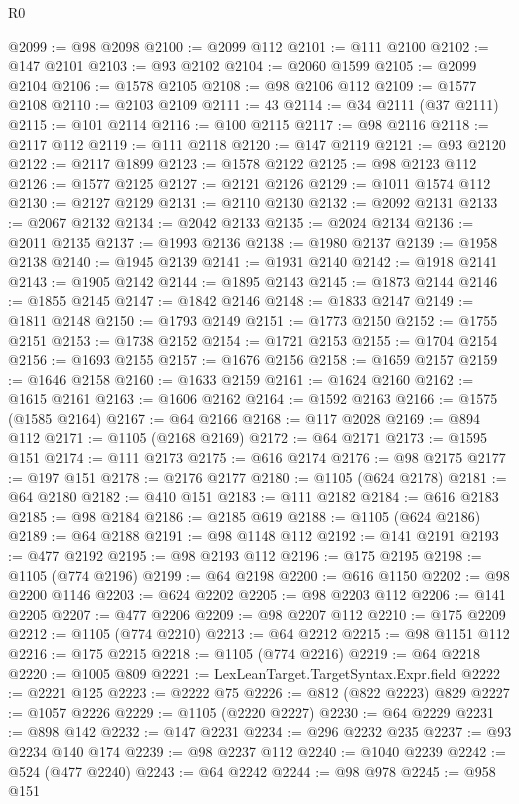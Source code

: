 \begin{lexlean}{R0}
\begin{coremodule}
@2099 := @98 @2098
@2100 := @2099 @112
@2101 := @111 @2100
@2102 := @147 @2101
@2103 := @93 @2102
@2104 := @2060 @1599
@2105 := @2099 @2104
@2106 := @1578 @2105
@2108 := @98 @2106 @112
@2109 := @1577 @2108
@2110 := @2103 @2109
@2111 := 43
@2114 := @34 @2111 (@37 @2111)
@2115 := @101 @2114
@2116 := @100 @2115
@2117 := @98 @2116
@2118 := @2117 @112
@2119 := @111 @2118
@2120 := @147 @2119
@2121 := @93 @2120
@2122 := @2117 @1899
@2123 := @1578 @2122
@2125 := @98 @2123 @112
@2126 := @1577 @2125
@2127 := @2121 @2126
@2129 := @1011 @1574 @112
@2130 := @2127 @2129
@2131 := @2110 @2130
@2132 := @2092 @2131
@2133 := @2067 @2132
@2134 := @2042 @2133
@2135 := @2024 @2134
@2136 := @2011 @2135
@2137 := @1993 @2136
@2138 := @1980 @2137
@2139 := @1958 @2138
@2140 := @1945 @2139
@2141 := @1931 @2140
@2142 := @1918 @2141
@2143 := @1905 @2142
@2144 := @1895 @2143
@2145 := @1873 @2144
@2146 := @1855 @2145
@2147 := @1842 @2146
@2148 := @1833 @2147
@2149 := @1811 @2148
@2150 := @1793 @2149
@2151 := @1773 @2150
@2152 := @1755 @2151
@2153 := @1738 @2152
@2154 := @1721 @2153
@2155 := @1704 @2154
@2156 := @1693 @2155
@2157 := @1676 @2156
@2158 := @1659 @2157
@2159 := @1646 @2158
@2160 := @1633 @2159
@2161 := @1624 @2160
@2162 := @1615 @2161
@2163 := @1606 @2162
@2164 := @1592 @2163
@2166 := @1575 (@1585 @2164)
@2167 := @64 @2166
@2168 := @117 @2028
@2169 := @894 @112
@2171 := @1105 (@2168 @2169)
@2172 := @64 @2171
@2173 := @1595 @151
@2174 := @111 @2173
@2175 := @616 @2174
@2176 := @98 @2175
@2177 := @197 @151
@2178 := @2176 @2177
@2180 := @1105 (@624 @2178)
@2181 := @64 @2180
@2182 := @410 @151
@2183 := @111 @2182
@2184 := @616 @2183
@2185 := @98 @2184
@2186 := @2185 @619
@2188 := @1105 (@624 @2186)
@2189 := @64 @2188
@2191 := @98 @1148 @112
@2192 := @141 @2191
@2193 := @477 @2192
@2195 := @98 @2193 @112
@2196 := @175 @2195
@2198 := @1105 (@774 @2196)
@2199 := @64 @2198
@2200 := @616 @1150
@2202 := @98 @2200 @1146
@2203 := @624 @2202
@2205 := @98 @2203 @112
@2206 := @141 @2205
@2207 := @477 @2206
@2209 := @98 @2207 @112
@2210 := @175 @2209
@2212 := @1105 (@774 @2210)
@2213 := @64 @2212
@2215 := @98 @1151 @112
@2216 := @175 @2215
@2218 := @1105 (@774 @2216)
@2219 := @64 @2218
@2220 := @1005 @809
@2221 := LexLeanTarget.TargetSyntax.Expr.field
@2222 := @2221 @125
@2223 := @2222 @75
@2226 := @812 (@822 @2223) @829
@2227 := @1057 @2226
@2229 := @1105 (@2220 @2227)
@2230 := @64 @2229
@2231 := @898 @142
@2232 := @147 @2231
@2234 := @296 @2232 @235
@2237 := @93 @2234 @140 @174
@2239 := @98 @2237 @112
@2240 := @1040 @2239
@2242 := @524 (@477 @2240)
@2243 := @64 @2242
@2244 := @98 @978
@2245 := @958 @151

\end{coremodule}
\end{lexlean}
